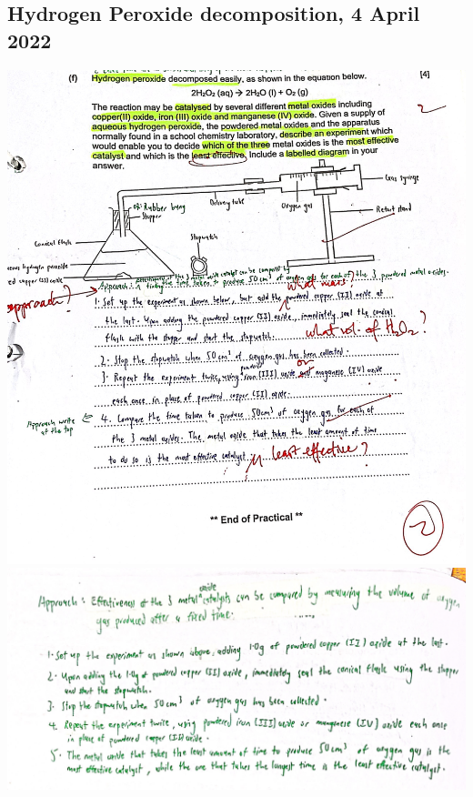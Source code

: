 \documentclass[oneside]{book}
\begin{document}
    \subsection{Hydrogen Peroxide decomposition, 4 April 2022}
    \begin{center}
        \includegraphics[width=\textwidth,height=\textheight,keepaspectratio]{images/83E95DF2-766C-402A-AF56-48AEA2066E8F.jpeg}\\
        \includegraphics[width=\textwidth,height=\textheight,keepaspectratio]{images/F69305D9-6946-4FE4-BC23-FE5FBC61CF76.jpeg}
    \end{center}
\end{document}
